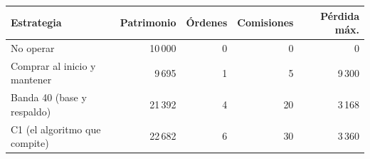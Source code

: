 \begin{tabular}{lrrrr}
\toprule
Estrategia & Patrimonio & Órdenes & Comisiones & Pérdida máx. \\
\midrule
No operar & 10\,000 & 0 & 0 & 0 \\
Comprar al inicio y mantener & 9\,695 & 1 & 5 & 9\,300 \\
Banda 40 (base y respaldo) & 21\,392 & 4 & 20 & 3\,168 \\
C1 (el algoritmo que compite) & 22\,682 & 6 & 30 & 3\,360 \\
\bottomrule
\end{tabular}
\par{}
